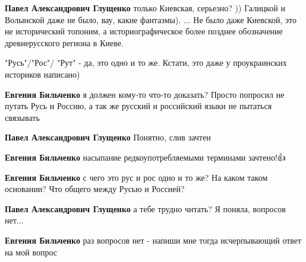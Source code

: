\begin{itemize}
\begin{itemize}

\textbf{Павел Александрович Глущенко} только Киевская, серьезно? )) Галицкой и Волынской даже не было, вау, какие фантазмы). ... Не было даже Киевской, это не исторический топоним, а историографическое более позднее обозначение древнерусского региона в Киеве.


"Русь"/"Рос"/ "Рут" - да, это одно и то же. Кстати, это даже у проукраинских историков написано)


\textbf{Евгения Бильченко} я должен кому-то что-то доказать? Просто попросил не путать Русь и Россию, а так же русский и российский языки не пытаться связывать


\textbf{Павел Александрович Глущенко} Понятно, слив зачтен


\textbf{Евгения Бильченко} насыпание редкоупотребляемыми терминами зачтено!👍


\textbf{Евгения Бильченко} с чего это рус и рос одно и то же? На каком таком основании? Что общего между Русью и Россией?


\textbf{Павел Александрович Глущенко} а тебе трудно читать? Я поняла, вопросов нет...


\textbf{Евгения Бильченко} раз вопросов нет - напиши мне тогда исчерпывающий ответ на мой вопрос
\end{itemize}


\end{itemize}
